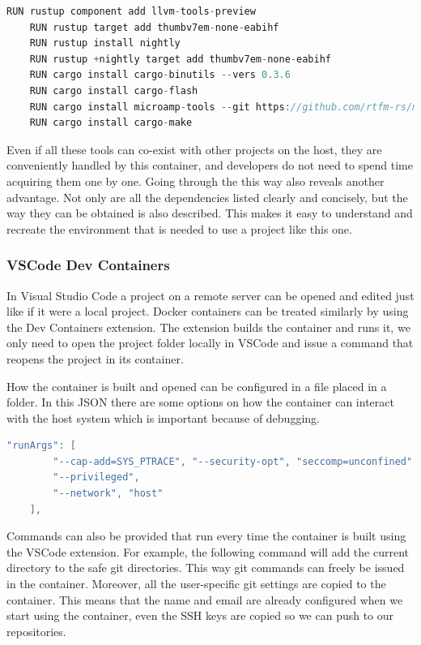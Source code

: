 \begin{lstlisting}[language=C,frame=single,float=!ht,label={lst:docker-cargo},caption={Installing Rust Specific Tools in the Container}]
    RUN rustup component add llvm-tools-preview
    RUN rustup target add thumbv7em-none-eabihf
    RUN rustup install nightly
    RUN rustup +nightly target add thumbv7em-none-eabihf
    RUN cargo install cargo-binutils --vers 0.3.6
    RUN cargo install cargo-flash
    RUN cargo install microamp-tools --git https://github.com/rtfm-rs/microamp
    RUN cargo install cargo-make
\end{lstlisting}

Even if all these tools can co-exist with other projects on the host, they are conveniently handled by this container, and developers do not need to spend time acquiring them one by one. Going through the  this way also reveals another advantage. Not only are all the dependencies listed clearly and concisely, but the way they can be obtained is also described. This makes it easy to understand and recreate the environment that is needed to use a project like this one.

\subsubsection{VSCode Dev Containers}

In Visual Studio Code a project on a remote server can be opened and edited just like if it were a local project. Docker containers can be treated similarly by using the Dev Containers extension. The extension builds the container and runs it, we only need to open the project folder locally in VSCode and issue a command that reopens the project in its container.

How the container is built and opened can be configured in a  file placed in a  folder. In this JSON there are some options on how the container can interact with the host system which is important because of debugging.

\begin{lstlisting}[language=C,frame=single,float=!ht,label={lst:devcont-args},caption={VSCode Devcontainer Arguments}]
    "runArgs": [
        "--cap-add=SYS_PTRACE", "--security-opt", "seccomp=unconfined",
        "--privileged",
        "--network", "host"
    ],
\end{lstlisting}

Commands can also be provided that run every time the container is built using the VSCode extension. For example, the following command will add the current directory to the safe git directories. This way git commands can freely be issued in the container. Moreover, all the user-specific git settings are copied to the container. This means that the name and email are already configured when we start using the container, even the SSH keys are copied so we can push to our repositories.

